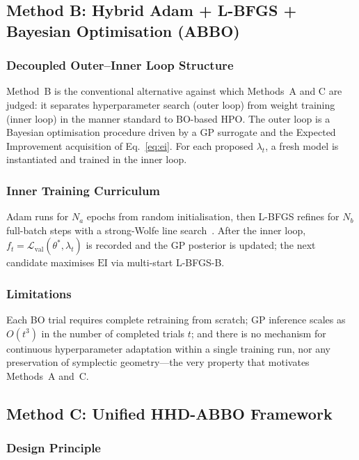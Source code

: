 \documentclass[11pt]{article}
\theoremstyle{definition}
\newcommand{\calL}{\mathcal{L}}
\newcommand{\EI}{\mathrm{EI}}
\begin{document}
\subsection{Method B: Hybrid Adam + L-BFGS + Bayesian Optimisation (ABBO)}

\subsubsection{Decoupled Outer--Inner Loop Structure}

Method~B is the conventional alternative against which Methods~A and
C are judged: it separates hyperparameter search (outer loop) from
weight training (inner loop) in the manner standard to BO-based HPO.
The outer loop is a Bayesian optimisation procedure driven by a GP
surrogate and the Expected Improvement acquisition of
Eq.~\eqref{eq:ei}. For each proposed $\lambda_t$, a fresh model is
instantiated and trained in the inner loop.

\subsubsection{Inner Training Curriculum}

Adam runs for $N_a$ epochs from random initialisation, then L-BFGS
refines for $N_b$ full-batch steps with a strong-Wolfe line
search~\cite{wolfe1969}. After the inner loop,
$f_t=\calL_{\mathrm{val}}(\theta^*,\lambda_t)$ is recorded and the GP
posterior is updated; the next candidate maximises $\EI$ via
multi-start L-BFGS-B.

\subsubsection{Limitations}

Each BO trial requires complete retraining from scratch; GP
inference scales as $O(t^3)$ in the number of completed trials $t$;
and there is no mechanism for continuous hyperparameter adaptation
within a single training run, nor any preservation of symplectic
geometry---the very property that motivates Methods~A and~C.

\subsection{Method C: Unified HHD-ABBO Framework}

\subsubsection{Design Principle}
\end{document}
